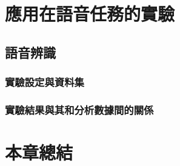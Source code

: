 \section{應用在語音任務的實驗}
\subsection{語音辨識}
\subsubsection{實驗設定與資料集}
\subsubsection{實驗結果與其和分析數據間的關係}
\section{本章總結}
